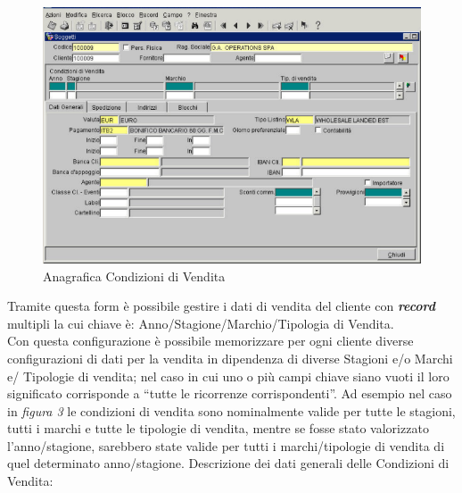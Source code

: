 \begin{figure}[!h]
\thispagestyle{empty}
\centering
\includegraphics[scale=0.90]{img/CondVen.png}
\caption{Anagrafica Condizioni di Vendita}
\end{figure}

Tramite questa form è possibile gestire i dati di vendita del cliente con \textbf{\textit{record}} multipli la cui chiave è: Anno/Stagione/Marchio/Tipologia di Vendita.\\
Con questa configurazione è possibile memorizzare per ogni cliente diverse configurazioni di dati per la vendita in dipendenza di diverse Stagioni e/o Marchi e/ Tipologie di vendita; nel caso in cui uno o più campi chiave siano vuoti il loro significato corrisponde a “tutte le ricorrenze corrispondenti”. Ad esempio nel caso in \textit{figura 3} le condizioni di vendita sono nominalmente valide per tutte le stagioni, tutti i marchi e tutte le tipologie di vendita, mentre se fosse stato valorizzato l'anno/stagione, sarebbero state valide per tutti i marchi/tipologie di vendita di quel determinato anno/stagione.
\newpage
Descrizione dei dati generali delle Condizioni di Vendita:

